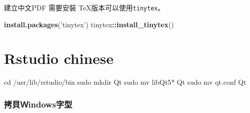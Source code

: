 \documentclass[]{book}
\newenvironment{Shaded}{\begin{snugshade}}{\end{snugshade}}
\newcommand{\KeywordTok}[1]{\textcolor[rgb]{0.13,0.29,0.53}{\textbf{#1}}}
\newcommand{\StringTok}[1]{\textcolor[rgb]{0.31,0.60,0.02}{#1}}
\newcommand{\FunctionTok}[1]{\textcolor[rgb]{0.00,0.00,0.00}{#1}}
\newcommand{\OperatorTok}[1]{\textcolor[rgb]{0.81,0.36,0.00}{\textbf{#1}}}
\newcommand{\BuiltInTok}[1]{#1}
\newcommand{\NormalTok}[1]{#1}
\theoremstyle{definition}
\theoremstyle{definition}
\theoremstyle{definition}
\theoremstyle{remark}
\begin{document}
建立中文PDF 需要安裝 TeX版本可以使用\texttt{tinytex}。

\begin{Shaded}
\begin{Highlighting}[]
\KeywordTok{install.packages}\NormalTok{(}\StringTok{'tinytex'}\NormalTok{)}
\NormalTok{tinytex}\OperatorTok{::}\KeywordTok{install_tinytex}\NormalTok{()}
\end{Highlighting}
\end{Shaded}

\section{Rstudio chinese}\label{rstudio-chinese}

\begin{Shaded}
\begin{Highlighting}[]
\BuiltInTok{cd}\NormalTok{ /usr/lib/rstudio/bin}
\FunctionTok{sudo}\NormalTok{ mkdir Qt}
\FunctionTok{sudo}\NormalTok{ mv libQt5* Qt}
\FunctionTok{sudo}\NormalTok{ mv qt.conf Qt}
\end{Highlighting}
\end{Shaded}

\subsubsection{拷貝Ｗindows字型}\label{indows}
\end{document}
